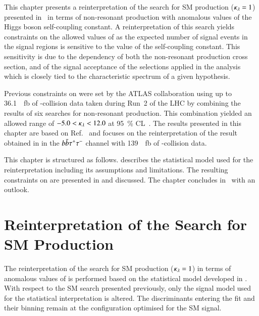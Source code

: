 This chapter presents a reinterpretation of the search for SM \HH
production ($\kappa_{\lambda} = 1$) presented in~ in terms
of non-resonant \HH production with anomalous values of the Higgs
boson self-coupling constant. A reinterpretation of this search yields
constraints on the allowed values of \klambda as the expected number
of signal events in the signal regions is sensitive to the value of
the self-coupling constant. This sensitivity is due to the \klambda
dependency of both the non-resonant \HH production cross section, and
of the signal acceptance of the selections applied in the analysis
which is closely tied to the characteristic \mHH spectrum of a given
\klambda hypothesis.

Previous constraints on \klambda were set by the ATLAS collaboration
using up to \SI{36.1}{\per\femto\barn} of \pp-collision data taken
during Run~2 of the LHC by combining the results of six searches for
non-resonant \HH production. This combination yielded an allowed range
of $-5.0 < \kappa_{\lambda} < 12.0$ at \SI{95}{\percent}
CL~\cite{HDBS-2018-58}. The results presented in this chapter are
based on Ref.~\cite{ATLAS-CONF-2021-052} and focuses on the
reinterpretation of the result obtained in  in the
$b\bar{b}\tau^{+} \tau^{-}$ channel with \SI{139}{\per\femto\barn} of
\pp-collision data.


This chapter is structured as follows. 
describes the statistical model used for the reinterpretation
including its assumptions and limitations. The resulting constraints
on \klambda are presented in  and
discussed. The chapter concludes
in~ with an outlook.


\section{Reinterpretation of the Search for SM \HH Production}%
\label{sec:reinterpretation}

The reinterpretation of the search for SM \HH production
($\kappa_{\lambda} = 1$) in terms of anomalous values of \klambda is performed
based on the statistical model developed in
. With respect to the SM \HH search
presented previously, only the signal model used for the statistical
interpretation is altered. The discriminants entering the fit and
their binning remain at the configuration optimised for the SM \HH
signal.

